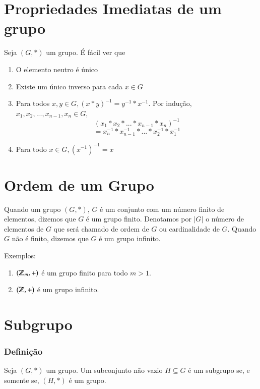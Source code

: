 \section{Propriedades Imediatas de um grupo}

Seja $(G,*)$ um grupo. {\'E} f{\'a}cil ver que
\begin{enumerate}
\item O elemento neutro {\'e} {\'u}nico
\item Existe um {\'u}nico inverso para cada $x\in G$
\item Para todos $x,y\in G,(x*y)^{-1}=y^{-1}*x^{-1}$. Por indu{\c c}{\~a}o, $x_{1},x_{2},...,x_{n-1},x_{n}\in G$, \[(x_{1}*x_{2}*...*x_{n-1}*x_{n})^{-1}\] \[=x^{-1}_{n}*x^{-1}_{n-1}*...*x^{-1}_{2}*x^{-1}_{1}\]
\item Para todo $x\in G, (x^{-1})^{-1}=x$

\end{enumerate}

\section{Ordem de um Grupo}
\begin{definicao}
Quando um grupo $(G,*)$, $G$ {\'e} um conjunto com um n{\'u}mero finito de elementos, dizemos que $G$ {\'e} um grupo finito. Denotamos por $|G|$ o n{\'u}mero de elementos de $G$ que ser{\'a} chamado de ordem de $G$ ou cardinalidade de $G$. Quando $G$ n{\~a}o {\'e} finito, dizemos que $G$ {\'e} um grupo infinito.
\end{definicao}

Exemplos:
\begin{enumerate}
\item $(\mathbb{Z}_m, +)$ {\'e} um grupo finito para todo $m>1$.
\item $(\mathbb{Z}, +)$ {\'e} um grupo infinito.
\end{enumerate}

\section{Subgrupo}
\subsubsection{Defini{\c c}{\~a}o}

\begin{definicao}[Subgrupo]
Seja $(G,*)$ um grupo. Um subconjunto n{\~a}o vazio $H\subseteq G$ {\'e} um subgrupo se, e somente se, $(H,*)$ {\'e} um grupo.
\end{definicao}

